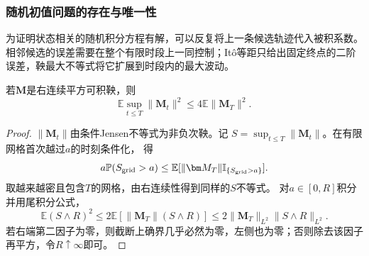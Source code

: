 \subsubsection{随机初值问题的存在与唯一性}
为证明状态相关的随机积分方程有解，可以反复将上一条候选轨迹代入被积系数。相邻候选的误差需要在整个有限时段上一同控制；Itô等距只给出固定终点的二阶误差，鞅最大不等式将它扩展到时段内的最大波动。
\begin{lemma}[二阶鞅最大不等式]
 \label{lem:action-state-doob-l2}
 若$\bm M$是右连续平方可积鞅，则
 \[
   \mathbb E\sup_{t\leq T}\|\bm M_t\|^2
      \leq4\mathbb E\|\bm M_T\|^2.
 \]
\end{lemma}
\begin{proof}
 $\|\bm M_t\|$由条件Jensen不等式为非负次鞅。记
 $S=\sup_{t\leq T}\|\bm M_t\|$。在有限网格首次越过$a$的时刻条件化，
 得
 \[
  a\mathbb P(S_{\rm grid}>a)
    \leq\mathbb E[\|\bm M_T\|\mathbb I_{\{S_{\rm grid}>a\}}].
 \]
 取越来越密且包含$T$的网格，由右连续性得到同样的$S$不等式。
 对$a\in[0,R]$积分并用尾积分公式，
 \[
  \mathbb E(S\wedge R)^2
    \leq2\mathbb E[\|\bm M_T\|(S\wedge R)]
    \leq2\|\bm M_T\|_{L^2}\|S\wedge R\|_{L^2}.
 \]
 若右端第二因子为零，则截断上确界几乎必然为零，左侧也为零；否则除去该因子再平方，令$R\uparrow\infty$即可。
\end{proof}


